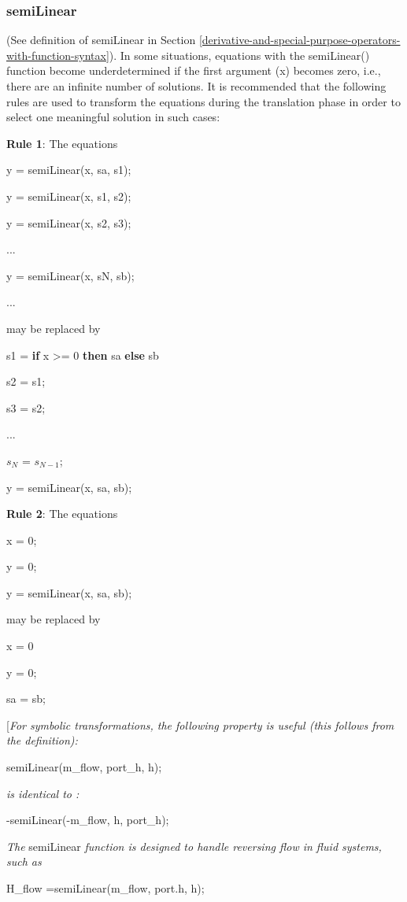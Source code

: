 \documentclass[10pt,a4paper]{report}
\def\doublelabel#1{\label{#1}\hypertarget{#1}{}}
\begin{document}
\subsubsection{semiLinear}\doublelabel{semilinear}

(See definition of semiLinear in Section \ref{derivative-and-special-purpose-operators-with-function-syntax}). In some situations,
equations with the semiLinear() function become underdetermined if the
first argument (x) becomes zero, i.e., there are an infinite number of
solutions. It is recommended that the following rules are used to
transform the equations during the translation phase in order to select
one meaningful solution in such cases:

\textbf{Rule 1}: The equations

y = semiLinear(x, sa, s1);

y = semiLinear(x, s1, s2);

y = semiLinear(x, s2, s3);

...

y = semiLinear(x, sN, sb);

...

may be replaced by

s1 = \textbf{if} x \textgreater{}= 0 \textbf{then} sa \textbf{else} sb

s2 = s1;

s3 = s2;

...

$s_N$ = $s_{N-1}$;

y = semiLinear(x, sa, sb);

\textbf{Rule 2}: The equations

x = 0;

y = 0;

y = semiLinear(x, sa, sb);

may be replaced by

x = 0

y = 0;

sa = sb;

{[}\emph{For symbolic transformations, the following property is useful
(this follows from the definition):}

semiLinear(m\_flow, port\_h, h);

\emph{is identical to :}

-semiLinear(-m\_flow, h, port\_h);

\emph{The} semiLinear \emph{function is designed to handle reversing
flow in fluid systems, such as}

H\_flow =semiLinear(m\_flow, port.h, h);
\end{document}
